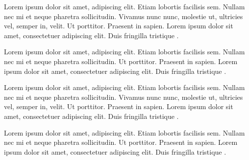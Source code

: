 \documentclass{article}
\begin{document}
 \begin{pairs}
   \begin{Leftside}
    \beginnumbering
    \pstart
    Lorem ipsum dolor sit amet,
     adipiscing elit. Etiam
    lobortis facilisis sem. Nullam nec mi et neque pharetra
    sollicitudin. Vivamus nunc nunc, molestie ut, ultricies vel,
    semper in, velit.
    \pend
    \pstart
    Ut porttitor. Praesent in sapien. Lorem ipsum dolor sit amet,
    consectetuer adipiscing elit. Duis fringilla tristique
    .
    \pend
    \endnumbering
  \end{Leftside}
   \begin{Rightside}
     \beginnumbering
     \pstart
     Lorem ipsum dolor sit amet,
      adipiscing elit. Etiam
     lobortis facilisis sem. Nullam nec mi et neque pharetra
     sollicitudin.
     \pend
     \pstart
     Ut porttitor. Praesent in sapien. Lorem ipsum dolor sit amet,
     consectetuer adipiscing elit. Duis fringilla tristique
     .
     \pend
     \endnumbering
   \end{Rightside}
 \Columns
 \end{pairs}
\clearpage
 \begin{pairs}
   \begin{Leftside}
    \beginnumbering
    \pstart
    Lorem ipsum dolor sit amet,
     adipiscing elit. Etiam
    lobortis facilisis sem. Nullam nec mi et neque pharetra
    sollicitudin. Vivamus nunc nunc, molestie ut, ultricies vel,
    semper in, velit.
    \pend
    \pstart
    Ut porttitor. Praesent in sapien. Lorem ipsum dolor sit amet,
    consectetuer adipiscing elit. Duis fringilla tristique
    .
    \pend
    \endnumbering
  \end{Leftside}
   \begin{Rightside}
     \beginnumbering
     \pstart
     Lorem ipsum dolor sit amet,
      adipiscing elit. Etiam
     lobortis facilisis sem. Nullam nec mi et neque pharetra
     sollicitudin.
     \pend
     \pstart
     Ut porttitor. Praesent in sapien. Lorem ipsum dolor sit amet,
     consectetuer adipiscing elit. Duis fringilla tristique
     .
     \pend
     \endnumbering
   \end{Rightside}
 \Columns
 \end{pairs}
\end{document}
